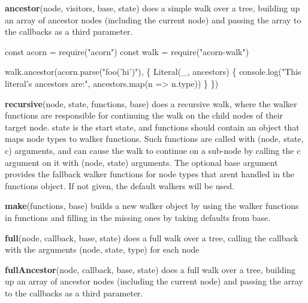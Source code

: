 

{\bfseries ancestor}{\ttfamily (node, visitors, base, state)} does a \textquotesingle{}simple\textquotesingle{} walk over a tree, building up an array of ancestor nodes (including the current node) and passing the array to the callbacks as a third parameter.


\begin{DoxyCode}
const acorn = require("acorn")
const walk = require("acorn-walk")

walk.ancestor(acorn.parse("foo('hi')"), \{
  Literal(\_, ancestors) \{
    console.log("This literal's ancestors are:", ancestors.map(n => n.type))
  \}
\})
\end{DoxyCode}


{\bfseries recursive}{\ttfamily (node, state, functions, base)} does a \textquotesingle{}recursive\textquotesingle{} walk, where the walker functions are responsible for continuing the walk on the child nodes of their target node. {\ttfamily state} is the start state, and {\ttfamily functions} should contain an object that maps node types to walker functions. Such functions are called with {\ttfamily (node, state, c)} arguments, and can cause the walk to continue on a sub-\/node by calling the {\ttfamily c} argument on it with {\ttfamily (node, state)} arguments. The optional {\ttfamily base} argument provides the fallback walker functions for node types that aren\textquotesingle{}t handled in the {\ttfamily functions} object. If not given, the default walkers will be used.

{\bfseries make}{\ttfamily (functions, base)} builds a new walker object by using the walker functions in {\ttfamily functions} and filling in the missing ones by taking defaults from {\ttfamily base}.

{\bfseries full}{\ttfamily (node, callback, base, state)} does a \textquotesingle{}full\textquotesingle{} walk over a tree, calling the callback with the arguments (node, state, type) for each node

{\bfseries full\+Ancestor}{\ttfamily (node, callback, base, state)} does a \textquotesingle{}full\textquotesingle{} walk over a tree, building up an array of ancestor nodes (including the current node) and passing the array to the callbacks as a third parameter.


